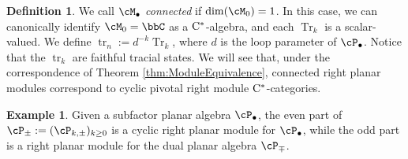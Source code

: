 \documentclass[11pt]{article}
\theoremstyle{plain}
\theoremstyle{definition}
\newtheorem{defn}[thm]{Definition}
\newtheorem{ex}[thm]{Example}
\DeclareMathOperator{\Tr}{Tr}
\DeclareMathOperator{\tr}{tr}
\newcommand{\Cstar}{\rm{C^*}}
\begin{document}
\begin{defn}
We call $\cM_\bullet$ \emph{connected} if $\dim(\cM_0) = 1$.
In this case, we can canonically identify $\cM_0 = \bbC$ as a $\Cstar$-algebra, and each $\Tr_k$ is a scalar-valued.
We define $\tr_n := d^{-k} \Tr_k$, where $d$ is the loop parameter of $\cP_\bullet$.
Notice that the $\tr_k$ are faithful tracial states.
We will see that, under the correspondence of Theorem \ref{thm:ModuleEquivalence}, connected right planar modules correspond to cyclic pivotal right module $\Cstar$-categories.
\end{defn}

\begin{ex}
 Given a subfactor planar algebra $\cP_\bullet$, the even part of $\cP_\pm :=( \cP_{k,\pm})_{k\geq 0}$ is a cyclic right planar module for $\cP_\bullet$, while the odd part is a right planar module for the dual planar algebra $\cP_{\mp}$. 
\end{ex}
\end{document}

